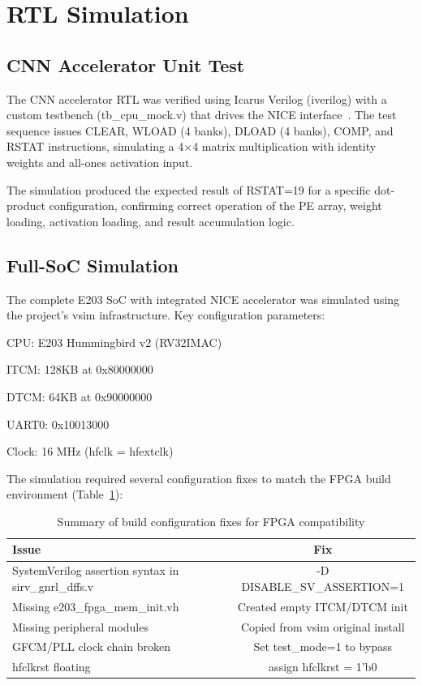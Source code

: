 

\section{RTL Simulation}\label{sec:4_1}

\subsection{CNN Accelerator Unit Test}

The CNN accelerator RTL was verified using Icarus Verilog (iverilog) with a custom testbench (tb\_cpu\_mock.v) that drives the NICE interface~\cite{NUCLEI_NICE}. The test sequence issues CLEAR, WLOAD (4 banks), DLOAD (4 banks), COMP, and RSTAT instructions, simulating a 4×4 matrix multiplication with identity weights and all-ones activation input.


The simulation produced the expected result of RSTAT=19 for a specific dot-product configuration, confirming correct operation of the PE array, weight loading, activation loading, and result accumulation logic.


\subsection{Full-SoC Simulation}

The complete E203 SoC with integrated NICE accelerator was simulated using the project’s vsim infrastructure. Key configuration parameters:


CPU: E203 Hummingbird v2 (RV32IMAC)


ITCM: 128KB at 0x80000000


DTCM: 64KB at 0x90000000


UART0: 0x10013000


Clock: 16 MHz (hfclk = hfextclk)


The simulation required several configuration fixes to match the FPGA build environment (Table~\ref{tab:4_1}):


\begin{table}[htbp]
\centering
\caption{Summary of build configuration fixes for FPGA compatibility}
\label{tab:4_1}
\begin{tabular}{lc}
\hline
Issue & Fix \\ \hline\hline
SystemVerilog assertion syntax in sirv\_gnrl\_dffs.v & -D DISABLE\_SV\_ASSERTION=1 \\ \hline
Missing e203\_fpga\_mem\_init.vh & Created empty ITCM/DTCM init \\ \hline
Missing peripheral modules & Copied from vsim original install \\ \hline
GFCM/PLL clock chain broken & Set test\_mode=1 to bypass \\ \hline
hfclkrst floating & assign hfclkrst = 1'b0 \\ \hline
\end{tabular}
\end{table}

